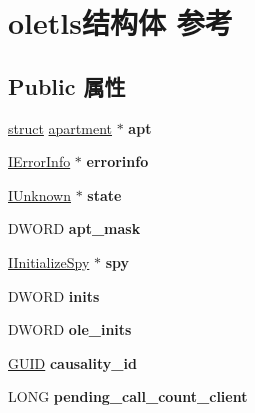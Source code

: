 \hypertarget{structoletls}{}\section{oletls结构体 参考}
\label{structoletls}
\subsection*{Public 属性}
\begin{DoxyCompactItemize}
\item 
\mbox{\label{structoletls_af723c0c3083d94b976b06823bccf9e16}} 
\hyperlink{interfacestruct}{struct} \hyperlink{structapartment}{apartment} $\ast$ {\bfseries apt}
\item 
\mbox{\label{structoletls_a26f92f6bdf7692370b04c5e9fd1a4b7c}} 
\hyperlink{interface_i_error_info}{I\+Error\+Info} $\ast$ {\bfseries errorinfo}
\item 
\mbox{\label{structoletls_a72d866c62ff090076ec778d470e49a8c}} 
\hyperlink{interface_i_unknown}{I\+Unknown} $\ast$ {\bfseries state}
\item 
\mbox{\label{structoletls_a83737d5604b27aef1dc475d060a14a63}} 
D\+W\+O\+RD {\bfseries apt\+\_\+mask}
\item 
\mbox{\label{structoletls_a87b49f4c1b53a76aae27ac9f4aa19e50}} 
\hyperlink{interface_i_initialize_spy}{I\+Initialize\+Spy} $\ast$ {\bfseries spy}
\item 
\mbox{\label{structoletls_add90215226eb74b28610bf6522778193}} 
D\+W\+O\+RD {\bfseries inits}
\item 
\mbox{\label{structoletls_ac24f04ccc32dd954c516e6b8affbcefd}} 
D\+W\+O\+RD {\bfseries ole\+\_\+inits}
\item 
\mbox{\label{structoletls_abbb9005860298b4b823272eaea014600}} 
\hyperlink{interface_g_u_i_d}{G\+U\+ID} {\bfseries causality\+\_\+id}
\item 
\mbox{\label{structoletls_a5eecfeef55f21e1d3f9ccf028dc1df71}} 
L\+O\+NG {\bfseries pending\+\_\+call\+\_\+count\+\_\+client}

\end{DoxyCompactItemize}
